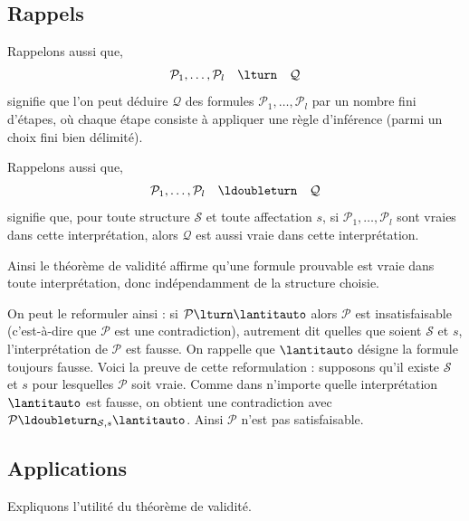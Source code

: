 \documentclass[11pt,class=report,crop=false]{standalone}
\begin{document}
\subsection{Rappels}

Rappelons aussi que, 
\[
\mathcal{P}_1, \ldots, \mathcal{P}_l \quad \lturn \quad \mathcal{Q}
\]
signifie que l'on peut déduire $\mathcal{Q}$ des formules $\mathcal{P}_1, \ldots, \mathcal{P}_l$ par un nombre fini d'étapes, où chaque étape consiste à appliquer une règle d'inférence (parmi un choix fini bien délimité).



Rappelons aussi que, 
\[
\mathcal{P}_1, \ldots, \mathcal{P}_l \quad \ldoubleturn \quad \mathcal{Q}
\]
signifie que, pour toute structure $\mathcal{S}$ et toute affectation $s$, si $\mathcal{P}_1, \ldots, \mathcal{P}_l$ sont vraies dans cette interprétation, alors $\mathcal{Q}$ est aussi vraie dans cette interprétation.

Ainsi le théorème de validité affirme qu'une formule prouvable est vraie dans toute interprétation, donc indépendamment de la structure choisie.

On peut le reformuler ainsi : si $\mathcal{P} \lturn \lantitauto$ alors $\mathcal{P}$ est insatisfaisable (c'est-à-dire que $\mathcal{P}$ est une contradiction),
autrement dit quelles que soient $\mathcal{S}$ et $s$, l'interprétation de $\mathcal{P}$ est fausse.
On rappelle que $\lantitauto$ désigne la formule toujours fausse.
Voici la preuve de cette reformulation : supposons qu'il existe $\mathcal{S}$ et $s$ pour lesquelles $\mathcal{P}$ soit vraie.
Comme dans n'importe quelle interprétation $\lantitauto$ est fausse, on obtient une contradiction avec $\mathcal{P} \ldoubleturn_{\mathcal{S},s} \lantitauto$. Ainsi $\mathcal{P}$ n'est pas satisfaisable.

\subsection{Applications}

Expliquons l'utilité du théorème de validité.
\end{document}
